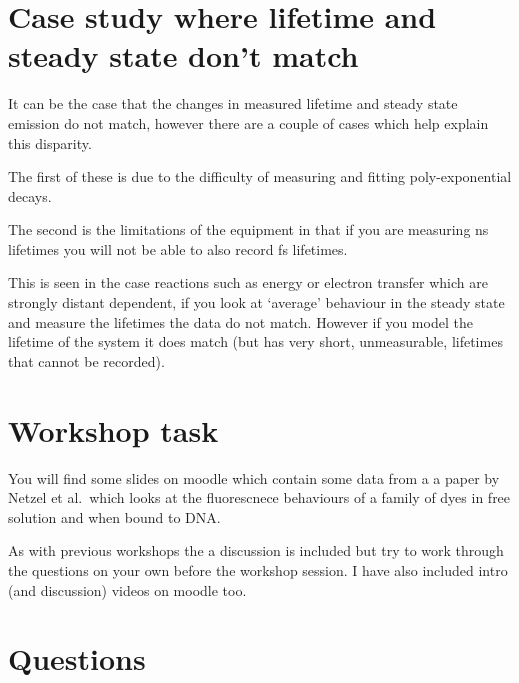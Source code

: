 \documentclass[
]{book}
\begin{document}
\hypertarget{case-study-where-lifetime-and-steady-state-dont-match}{%
\section{Case study where lifetime and steady state don't match}\label{case-study-where-lifetime-and-steady-state-dont-match}}

It can be the case that the changes in measured lifetime and steady state emission do not match, however there are a couple of cases which help explain this disparity.

The first of these is due to the difficulty of measuring and fitting poly-exponential decays.

The second is the limitations of the equipment in that if you are measuring ns lifetimes you will not be able to also record fs lifetimes.

This is seen in the case reactions such as energy or electron transfer which are strongly distant dependent, if you look at `average' behaviour in the steady state and measure the lifetimes the data do not match. However if you model the lifetime of the system it does match (but has very short, unmeasurable, lifetimes that cannot be recorded).

\hypertarget{workshop-task}{%
\section{Workshop task}\label{workshop-task}}

You will find some slides on moodle which contain some data from a a paper by Netzel et al.~which looks at the fluorescnece behaviours of a family of dyes in free solution and when bound to DNA.

As with previous workshops the a discussion is included but try to work through the questions on your own before the workshop session. I have also included intro (and discussion) videos on moodle too.

\hypertarget{questions}{%
\section{Questions}\label{questions}}

  
\end{document}
